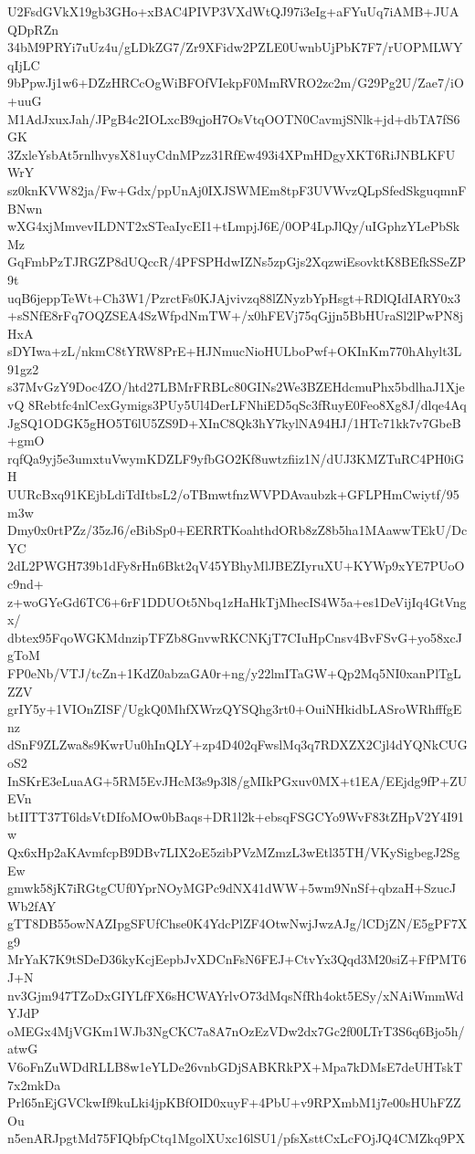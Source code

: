 U2FsdGVkX19gb3GHo+xBAC4PIVP3VXdWtQJ97i3eIg+aFYuUq7iAMB+JUAQDpRZn
34bM9PRYi7uUz4u/gLDkZG7/Zr9XFidw2PZLE0UwnbUjPbK7F7/rUOPMLWYqIjLC
9bPpwJj1w6+DZzHRCcOgWiBFOfVIekpF0MmRVRO2zc2m/G29Pg2U/Zae7/iO+uuG
M1AdJxuxJah/JPgB4c2IOLxcB9qjoH7OsVtqOOTN0CavmjSNlk+jd+dbTA7fS6GK
3ZxleYsbAt5rnlhvysX81uyCdnMPzz31RfEw493i4XPmHDgyXKT6RiJNBLKFUWrY
sz0knKVW82ja/Fw+Gdx/ppUnAj0IXJSWMEm8tpF3UVWvzQLpSfedSkguqmnFBNwn
wXG4xjMmvevILDNT2xSTeaIycEI1+tLmpjJ6E/0OP4LpJlQy/uIGphzYLePbSkMz
GqFmbPzTJRGZP8dUQccR/4PFSPHdwIZNs5zpGjs2XqzwiEsovktK8BEfkSSeZP9t
uqB6jeppTeWt+Ch3W1/PzrctFs0KJAjvivzq88lZNyzbYpHsgt+RDlQIdIARY0x3
+sSNfE8rFq7OQZSEA4SzWfpdNmTW+/x0hFEVj75qGjjn5BbHUraSl2lPwPN8jHxA
sDYIwa+zL/nkmC8tYRW8PrE+HJNmucNioHULboPwf+OKInKm770hAhylt3L91gz2
s37MvGzY9Doc4ZO/htd27LBMrFRBLc80GINs2We3BZEHdcmuPhx5bdlhaJ1XjevQ
8Rebtfc4nlCexGymigs3PUy5Ul4DerLFNhiED5qSc3fRuyE0Feo8Xg8J/dlqe4Aq
JgSQ1ODGK5gHO5T6lU5ZS9D+XInC8Qk3hY7kylNA94HJ/1HTc71kk7v7GbeB+gmO
rqfQa9yj5e3umxtuVwymKDZLF9yfbGO2Kf8uwtzfiiz1N/dUJ3KMZTuRC4PH0iGH
UURcBxq91KEjbLdiTdItbsL2/oTBmwtfnzWVPDAvaubzk+GFLPHmCwiytf/95m3w
Dmy0x0rtPZz/35zJ6/eBibSp0+EERRTKoahthdORb8zZ8b5ha1MAawwTEkU/DcYC
2dL2PWGH739b1dFy8rHn6Bkt2qV45YBhyMlJBEZIyruXU+KYWp9xYE7PUoOc9nd+
z+woGYeGd6TC6+6rF1DDUOt5Nbq1zHaHkTjMhecIS4W5a+es1DeVijIq4GtVngx/
dbtex95FqoWGKMdnzipTFZb8GnvwRKCNKjT7CIuHpCnsv4BvFSvG+yo58xcJgToM
FP0eNb/VTJ/tcZn+1KdZ0abzaGA0r+ng/y22lmITaGW+Qp2Mq5NI0xanPlTgLZZV
grIY5y+1VIOnZISF/UgkQ0MhfXWrzQYSQhg3rt0+OuiNHkidbLASroWRhfffgEnz
dSnF9ZLZwa8s9KwrUu0hInQLY+zp4D402qFwslMq3q7RDXZX2Cjl4dYQNkCUGoS2
InSKrE3eLuaAG+5RM5EvJHcM3s9p3l8/gMIkPGxuv0MX+t1EA/EEjdg9fP+ZUEVn
btIITT37T6ldsVtDIfoMOw0bBaqs+DR1l2k+ebsqFSGCYo9WvF83tZHpV2Y4I91w
Qx6xHp2aKAvmfcpB9DBv7LIX2oE5zibPVzMZmzL3wEtl35TH/VKySigbegJ2SgEw
gmwk58jK7iRGtgCUf0YprNOyMGPc9dNX41dWW+5wm9NnSf+qbzaH+SzucJWb2fAY
gTT8DB55owNAZIpgSFUfChse0K4YdcPlZF4OtwNwjJwzAJg/lCDjZN/E5gPF7Xg9
MrYaK7K9tSDeD36kyKcjEepbJvXDCnFsN6FEJ+CtvYx3Qqd3M20siZ+FfPMT6J+N
nv3Gjm947TZoDxGIYLfFX6sHCWAYrlvO73dMqsNfRh4okt5ESy/xNAiWmmWdYJdP
oMEGx4MjVGKm1WJb3NgCKC7a8A7nOzEzVDw2dx7Gc2f00LTrT3S6q6Bjo5h/atwG
V6oFnZuWDdRLLB8w1eYLDe26vnbGDjSABKRkPX+Mpa7kDMsE7deUHTskT7x2mkDa
Prl65nEjGVCkwIf9kuLki4jpKBfOID0xuyF+4PbU+v9RPXmbM1j7e00sHUhFZZOu
n5enARJpgtMd75FIQbfpCtq1MgolXUxc16lSU1/pfsXsttCxLcFOjJQ4CMZkq9PX
